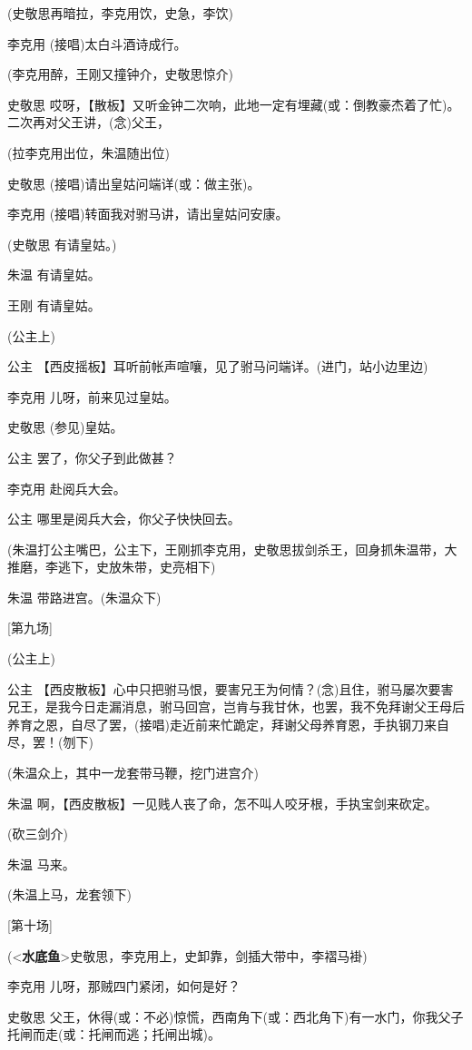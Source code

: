 (史敬思再暗拉，李克用饮，史急，李饮)

李克用 (接唱)太白斗酒诗成行。

(李克用醉，王刚又撞钟介，史敬思惊介)

史敬思
哎呀，【散板】又听金钟二次响，此地一定有埋藏(或：倒教豪杰着了忙)。二次再对父王讲，(念)父王，

(拉李克用出位，朱温随出位)

史敬思 (接唱)请出皇姑问端详(或：做主张)。

李克用 (接唱)转面我对驸马讲，请出皇姑问安康。

(史敬思 有请皇姑。)

朱温 有请皇姑。

王刚 有请皇姑。

(公主上)

公主 【西皮摇板】耳听前帐声喧嚷，见了驸马问端详。(进门，站小边里边)

李克用 儿呀，前来见过皇姑。

史敬思 (参见)皇姑。

公主 罢了，你父子到此做甚？

李克用 赴阅兵大会。

公主 哪里是阅兵大会，你父子快快回去。

(朱温打公主嘴巴，公主下，王刚抓李克用，史敬思拔剑杀王，回身抓朱温带，大推磨，李逃下，史放朱带，史亮相下)

朱温 带路进宫。(朱温众下)

{[}第九场{]}

(公主上)

公主
【西皮散板】心中只把驸马恨，要害兄王为何情？(念)且住，驸马屡次要害兄王，是我今日走漏消息，驸马回宫，岂肯与我甘休，也罢，我不免拜谢父王母后养育之恩，自尽了罢，(接唱)走近前来忙跪定，拜谢父母养育恩，手执钢刀来自尽，罢！(刎下)

(朱温众上，其中一龙套带马鞭，挖门进宫介)

朱温 啊，【西皮散板】一见贱人丧了命，怎不叫人咬牙根，手执宝剑来砍定。

(砍三剑介)

朱温 马来。

(朱温上马，龙套领下)

{[}第十场{]}

(\textless{}\textbf{水底鱼}\textgreater{}史敬思，李克用上，史卸靠，剑插大带中，李褶马褂)

李克用 儿呀，那贼四门紧闭，如何是好？

史敬思
父王，休得(或：不必)惊慌，西南角下(或：西北角下)有一水门，你我父子托闸而走(或：托闸而逃；托闸出城)。


